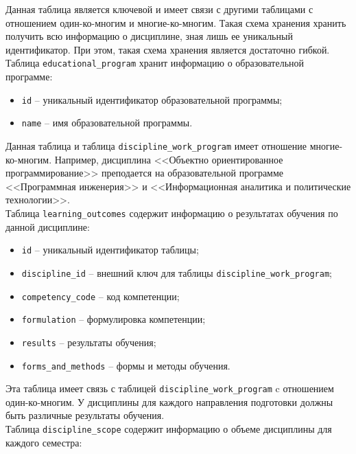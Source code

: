 Данная таблица является ключевой и имеет связи с другими таблицами с отношением один-ко-многим и многие-ко-многим. Такая схема хранения хранить получить всю информацию о дисциплине, зная лишь ее уникальный идентификатор. При этом, такая схема хранения является достаточно гибкой.\\

Таблица \texttt{educational\_program} хранит информацию о образовательной программе:

\begin{itemize}
	\item \texttt{id} -- уникальный идентификатор образовательной программы;
	\item \texttt{name} -- имя образовательной программы.
\end{itemize}
 
Данная таблица и таблица \texttt{discipline\_work\_program} имеет отношение многие-ко-многим. Например, дисциплина <<Объектно ориентированное программирование>> преподается на образовательной программе <<Программная инженерия>> и <<Информационная аналитика и политические технологии>>.\\

Таблица \texttt{learning\_outcomes} содержит информацию о результатах обучения по данной дисциплине:

\begin{itemize}
	\item \texttt{id} -- уникальный идентификатор таблицы;
	\item \texttt{discipline\_id} -- внешний ключ для таблицы \texttt{discipline\_work\_program};
	\item \texttt{competency\_code} -- код компетенции;
	\item \texttt{formulation} -- формулировка компетенции;
	\item \texttt{results} -- результаты обучения;
	\item \texttt{forms\_and\_methods} -- формы и методы обучения.
\end{itemize}

Эта таблица имеет связь с таблицей \texttt{discipline\_work\_program} c отношением один-ко-многим. У дисциплины для каждого направления подготовки должны быть различные результаты обучения.\\

Таблица \texttt{discipline\_scope} содержит информацию о объеме дисциплины для каждого семестра:

